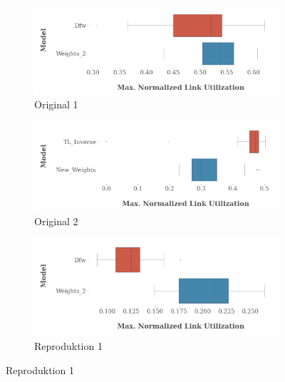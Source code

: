         \begin{figure}
            \centering
            \begin{subfigure}{0.45\textwidth}
                \centering
                \includegraphics[width=1\linewidth]{Report/bilder/reproduktion/projekt2/original1.png}
                \caption{Original 1}
                \label{fig:reproduktion_project_2_original_1}
            \end{subfigure}
            \begin{subfigure}{0.45\textwidth}
                \centering
                \includegraphics[width=1\linewidth]{Report/bilder/reproduktion/projekt2/original2.png}
                \caption{Original 2}
                \label{fig:reproduktion_project_2_original_2}
            \end{subfigure}
            \begin{subfigure}{0.45\textwidth}
                \centering
                \includegraphics[width=1\linewidth]{Report/bilder/reproduktion/projekt2/reproduktion1.png}
                \caption{Reproduktion 1}

\end{subfigure}
\end{figure}
